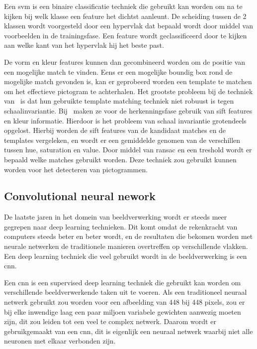             Een \gls{svm} is een binaire classificatie techniek die gebruikt kan worden om na te kijken bij welk klasse een feature het dichtst aanleunt.
            De scheiding tussen de 2 klassen wordt voorgesteld door een hypervlak dat bepaald wordt door middel van voorbeelden in de trainingsfase.
            Een feature wordt geclassificeerd door te kijken aan welke kant van het hypervlak hij het beste past.

            De vorm en kleur features kunnen dan gecombineerd worden om de positie van een mogelijke match te vinden. Eens er een mogelijke boundig box rond de mogelijke match gevonden is,
            kan er geprobeerd worden een template te matchen om het effectieve pictogram te achterhalen. Het grootste probleem bij de techniek van~\cite{Fang2003} is
            dat hun gebruikte template matching techniek niet robuust is tegen schaalinvariantie.
            Bij~\cite{Zabihi2017} maken ze voor de herkenningsfase gebruik van \gls{sift}\cite{Lowe1999} features en kleur informatie.
            Hierdoor is het probleem van schaal invariantie grotendeels opgelost.
            Hierbij worden de \gls{sift} features van de kandidaat matches en de templates vergeleken, en wordt er een gemiddelde genomen van de verschillen tussen hue, saturation en value.
            Door middel van \gls{ransac} en een treshold wordt er bepaald welke matches gebruikt worden. Deze techniek zou gebruikt kunnen worden voor het detecteren van pictogrammen.

        
        \subsection{Convolutional neural nework} \label{sec:yolo}
            De laatste jaren in het domein van beeldverwerking wordt er steeds meer gegrepen naar deep learning technieken.
            Dit komt omdat de rekenkracht van computers steeds beter en beter wordt, en de resultaten die bekomen worden met neurale netwerken de traditionele manieren overtreffen op verschillende vlakken.
            Een deep learning techniek die veel gebruikt wordt in de beeldverwerking is een \gls{cnn}.

            Een \gls{cnn} is een supervised deep learning techniek die gebruikt kan worden om verschillende beeldverwerkende taken uit te voeren.
            Als een traditioneel neuraal netwerk gebruikt zou worden voor een afbeelding van 448 bij 448 pixels, zou er bij elke inwendige laag een paar miljoen variabele gewichten aanwezig moeten zijn,
            dit zou leiden tot een veel te complex netwerk. Daarom wordt er gebruikgemaakt van een \gls{cnn}, dit is eigenlijk een neuraal netwerk waarbij niet alle neuronen met elkaar verbonden zijn.

